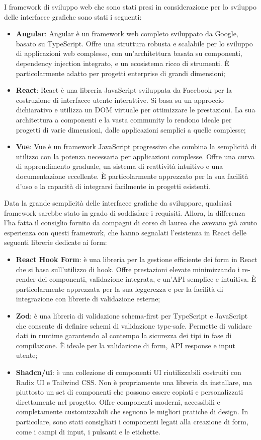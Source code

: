 I framework di sviluppo web che sono stati presi in considerazione per lo sviluppo delle interfacce grafiche sono stati i seguenti:
\begin{itemize}
    \item \textbf{Angular}: Angular è un framework web completo sviluppato da Google, basato su TypeScript. Offre una struttura robusta e scalabile per lo sviluppo di applicazioni web complesse, con un'architettura basata su componenti, dependency injection integrato, e un ecosistema ricco di strumenti. È particolarmente adatto per progetti enterprise di grandi dimensioni;
    \item \textbf{React}: React è una libreria JavaScript sviluppata da Facebook per la costruzione di interfacce utente interattive. Si basa su un approccio dichiarativo e utilizza un DOM virtuale per ottimizzare le prestazioni. La sua architettura a componenti e la vasta community lo rendono ideale per progetti di varie dimensioni, dalle applicazioni semplici a quelle complesse;
    \item \textbf{Vue}: Vue è un framework JavaScript progressivo che combina la semplicità di utilizzo con la potenza necessaria per applicazioni complesse. Offre una curva di apprendimento graduale, un sistema di reattività intuitivo e una documentazione eccellente. È particolarmente apprezzato per la sua facilità d'uso e la capacità di integrarsi facilmente in progetti esistenti.
\end{itemize}

Data la grande semplicità delle interfacce grafiche da sviluppare, qualsiasi framework sarebbe stato in grado di soddisfare i requisiti. Allora, la differenza l'ha fatta il consiglio fornito da compagni di corso di laurea che avevano già avuto esperienza con questi framework, che hanno segnalati l'esistenza in React delle seguenti librerie dedicate ai form:
\begin{itemize}
    \item \textbf{React Hook Form}: è una libreria per la gestione efficiente dei form in React che si basa sull'utilizzo di hook. Offre prestazioni elevate minimizzando i re-render dei componenti, validazione integrata, e un'API semplice e intuitiva. È particolarmente apprezzata per la sua leggerezza e per la facilità di integrazione con librerie di validazione esterne;
    \item \textbf{Zod}: è una libreria di validazione schema-first per TypeScript e JavaScript che consente di definire schemi di validazione type-safe. Permette di validare dati in runtime garantendo al contempo la sicurezza dei tipi in fase di compilazione. È ideale per la validazione di form, API response e input utente;
    \item \textbf{Shadcn/ui}: è una collezione di componenti UI riutilizzabili costruiti con Radix UI e Tailwind CSS. Non è propriamente una libreria da installare, ma piuttosto un set di componenti che possono essere copiati e personalizzati direttamente nel progetto. Offre componenti moderni, accessibili e completamente customizzabili che seguono le migliori pratiche di design. In particolare, sono stati consigliati i componenti legati alla creazione di form, come i campi di input, i pulsanti e le etichette.
\end{itemize}

